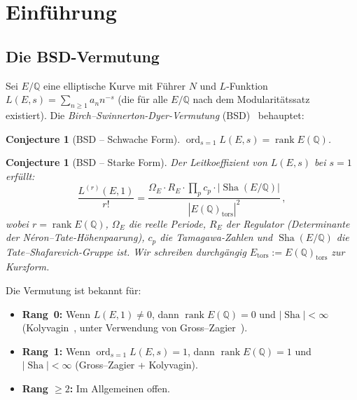\documentclass[aps,prd,twocolumn,superscriptaddress,nofootinbib,floatfix]{revtex4-2}
\newtheorem{conjecture}[theorem]{Conjecture}
\theoremstyle{definition}
\theoremstyle{remark}
\DeclareMathOperator{\ord}{ord}
\DeclareMathOperator{\rank}{rank}
\DeclareMathOperator{\Sha}{Sha}
\begin{document}
\section{Einführung}
\label{sec:intro}

\subsection{Die BSD-Vermutung}

Sei $E/\mathbb{Q}$ eine elliptische Kurve mit Führer $N$ und $L$-Funktion $L(E,s) = \sum_{n \geq 1} a_n n^{-s}$ (die für alle $E/\mathbb{Q}$ nach dem Modularitätssatz~\cite{Wiles1995} existiert). Die \textit{Birch--Swinnerton-Dyer-Vermutung} (BSD)~\cite{BSD1965} behauptet:

\begin{conjecture}[BSD -- Schwache Form]
\label{conj:bsd_weak}
$\ord_{s=1} L(E,s) = \rank E(\mathbb{Q})$.
\end{conjecture}

\begin{conjecture}[BSD -- Starke Form]
\label{conj:bsd_strong}
Der Leitkoeffizient von $L(E,s)$ bei $s = 1$ erfüllt:
\begin{equation}
\frac{L^{(r)}(E,1)}{r!} = \frac{\Omega_E \cdot R_E \cdot \prod_p c_p \cdot |\Sha(E/\mathbb{Q})|}{|E(\mathbb{Q})_{\mathrm{tors}}|^2}\,,
\label{eq:bsd_formula}
\end{equation}
wobei $r = \rank E(\mathbb{Q})$, $\Omega_E$ die reelle Periode, $R_E$ der Regulator (Determinante der Néron--Tate-Höhenpaarung), $c_p$ die Tamagawa-Zahlen und $\Sha(E/\mathbb{Q})$ die Tate--Shafarevich-Gruppe ist. Wir schreiben durchgängig $E_{\mathrm{tors}} := E(\mathbb{Q})_{\mathrm{tors}}$ zur Kurzform.
\end{conjecture}

Die Vermutung ist bekannt für:
\begin{itemize}
\item \textbf{Rang~0:} Wenn $L(E,1) \neq 0$, dann $\rank E(\mathbb{Q}) = 0$ und $|\Sha| < \infty$ (Kolyvagin~\cite{Kolyvagin1990}, unter Verwendung von Gross--Zagier~\cite{GrossZagier1986}).
\item \textbf{Rang~1:} Wenn $\ord_{s=1} L(E,s) = 1$, dann $\rank E(\mathbb{Q}) = 1$ und $|\Sha| < \infty$ (Gross--Zagier + Kolyvagin).
\item \textbf{Rang $\geq 2$:} Im Allgemeinen offen.
\end{itemize}
\end{document}
